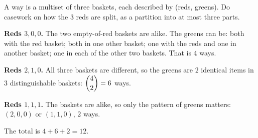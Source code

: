 A way is a multiset of three baskets, each described by (reds, greens). Do casework on how the $3$ reds are split, as a partition into at most three parts.

\textbf{Reds $3,0,0$.} The two empty-of-red baskets are alike. The greens can be: both with the red basket; both in one other basket; one with the reds and one in another basket; one in each of the other two baskets. That is $4$ ways.

\textbf{Reds $2,1,0$.} All three baskets are different, so the greens are $2$ identical items in $3$ distinguishable baskets: $\dbinom{4}{2}=6$ ways.

\textbf{Reds $1,1,1$.} The baskets are alike, so only the pattern of greens matters: $(2,0,0)$ or $(1,1,0)$, $2$ ways.

The total is $4+6+2=\boxed{12}$.
